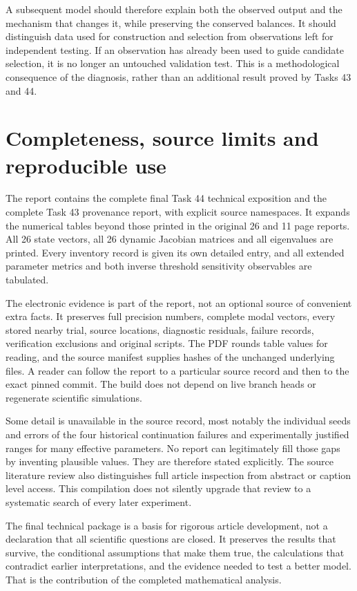 A subsequent model should therefore explain both the observed output and the mechanism that changes it, while preserving the conserved balances. It should distinguish data used for construction and selection from observations left for independent testing. If an observation has already been used to guide candidate selection, it is no longer an untouched validation test. This is a methodological consequence of the diagnosis, rather than an additional result proved by Tasks 43 and 44.

\section{Completeness, source limits and reproducible use}
\label{sec:report-completeness}
The report contains the complete final Task 44 technical exposition and the complete Task 43 provenance report, with explicit source namespaces. It expands the numerical tables beyond those printed in the original 26 and 11 page reports. All 26 state vectors, all 26 dynamic Jacobian matrices and all eigenvalues are printed. Every inventory record is given its own detailed entry, and all extended parameter metrics and both inverse threshold sensitivity observables are tabulated.

The electronic evidence is part of the report, not an optional source of convenient extra facts. It preserves full precision numbers, complete modal vectors, every stored nearby trial, source locations, diagnostic residuals, failure records, verification exclusions and original scripts. The PDF rounds table values for reading, and the source manifest supplies hashes of the unchanged underlying files. A reader can follow the report to a particular source record and then to the exact pinned commit. The build does not depend on live branch heads or regenerate scientific simulations.

Some detail is unavailable in the source record, most notably the individual seeds and errors of the four historical continuation failures and experimentally justified ranges for many effective parameters. No report can legitimately fill those gaps by inventing plausible values. They are therefore stated explicitly. The source literature review also distinguishes full article inspection from abstract or caption level access. This compilation does not silently upgrade that review to a systematic search of every later experiment.

The final technical package is a basis for rigorous article development, not a declaration that all scientific questions are closed. It preserves the results that survive, the conditional assumptions that make them true, the calculations that contradict earlier interpretations, and the evidence needed to test a better model. That is the contribution of the completed mathematical analysis.
